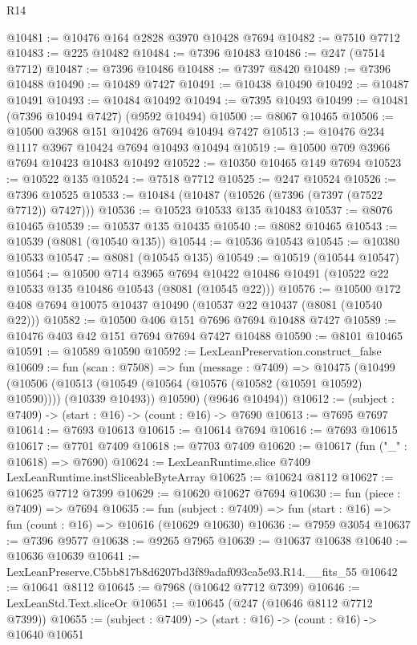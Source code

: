\begin{lexlean}{R14}
\begin{coremodule}
@10481 := @10476 @164 @2828 @3970 @10428 @7694
@10482 := @7510 @7712
@10483 := @225 @10482
@10484 := @7396 @10483
@10486 := @247 (@7514 @7712)
@10487 := @7396 @10486
@10488 := @7397 @8420
@10489 := @7396 @10488
@10490 := @10489 @7427
@10491 := @10438 @10490
@10492 := @10487 @10491
@10493 := @10484 @10492
@10494 := @7395 @10493
@10499 := @10481 (@7396 @10494 @7427) (@9592 @10494)
@10500 := @8067 @10465
@10506 := @10500 @3968 @151 @10426 @7694 @10494 @7427
@10513 := @10476 @234 @1117 @3967 @10424 @7694 @10493 @10494
@10519 := @10500 @709 @3966 @7694 @10423 @10483 @10492
@10522 := @10350 @10465 @149 @7694
@10523 := @10522 @135
@10524 := @7518 @7712
@10525 := @247 @10524
@10526 := @7396 @10525
@10533 := @10484 (@10487 (@10526 (@7396 (@7397 (@7522 @7712)) @7427)))
@10536 := @10523 @10533 @135 @10483
@10537 := @8076 @10465
@10539 := @10537 @135 @10435
@10540 := @8082 @10465
@10543 := @10539 (@8081 (@10540 @135))
@10544 := @10536 @10543
@10545 := @10380 @10533
@10547 := @8081 (@10545 @135)
@10549 := @10519 (@10544 @10547)
@10564 := @10500
    @714
    @3965
    @7694
    @10422
    @10486
    @10491
    (@10522 @22 @10533 @135 @10486 @10543 (@8081 (@10545 @22)))
@10576 := @10500 @172 @408 @7694 @10075 @10437 @10490 (@10537 @22 @10437 (@8081 (@10540 @22)))
@10582 := @10500 @406 @151 @7696 @7694 @10488 @7427
@10589 := @10476 @403 @42 @151 @7694 @7694 @7427 @10488
@10590 := @8101 @10465
@10591 := @10589 @10590
@10592 := LexLeanPreservation.construct_false
@10609 := fun (scan : @7508) =>
  fun (message : @7409) =>
  @10475
    (@10499
      (@10506
        (@10513 (@10549 (@10564 (@10576 (@10582 (@10591 @10592) @10590)))) (@10339 @10493))
        @10590)
      (@9646 @10494))
@10612 := (subject : @7409) -> (start : @16) -> (count : @16) -> @7690
@10613 := @7695 @7697
@10614 := @7693 @10613
@10615 := @10614 @7694
@10616 := @7693 @10615
@10617 := @7701 @7409
@10618 := @7703 @7409
@10620 := @10617 (fun ("_" : @10618) => @7690)
@10624 := LexLeanRuntime.slice @7409 LexLeanRuntime.instSliceableByteArray
@10625 := @10624 @8112
@10627 := @10625 @7712 @7399
@10629 := @10620 @10627 @7694
@10630 := fun (piece : @7409) => @7694
@10635 := fun (subject : @7409) => fun (start : @16) => fun (count : @16) => @10616 (@10629 @10630)
@10636 := @7959 @3054
@10637 := @7396 @9577
@10638 := @9265 @7965
@10639 := @10637 @10638
@10640 := @10636 @10639
@10641 := LexLeanPreserve.C5bb817b8d6207bd3f89adaf093ca5e93.R14.__fits_55
@10642 := @10641 @8112
@10645 := @7968 (@10642 @7712 @7399)
@10646 := LexLeanStd.Text.sliceOr
@10651 := @10645 (@247 (@10646 @8112 @7712 @7399))
@10655 := (subject : @7409) -> (start : @16) -> (count : @16) -> @10640 @10651

\end{coremodule}
\end{lexlean}
